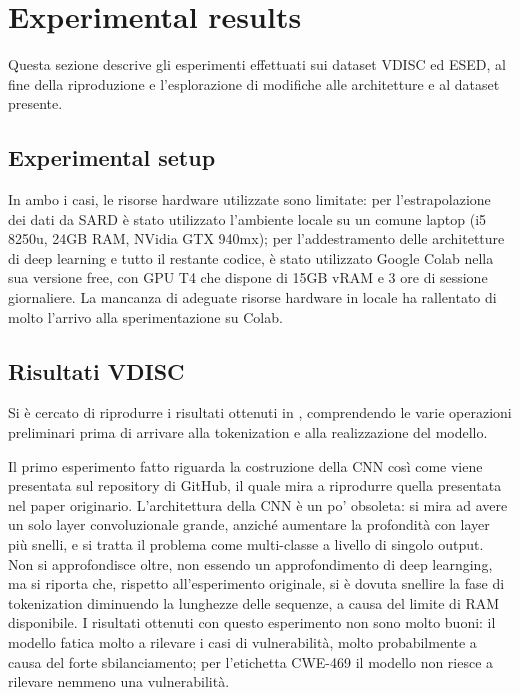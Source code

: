 \documentclass[conference]{IEEEtran}
\begin{document}
\section{Experimental results}

Questa sezione descrive gli esperimenti effettuati sui dataset VDISC ed ESED, al fine della riproduzione e l'esplorazione di modifiche alle architetture e al dataset presente.

\subsection{Experimental setup}
In ambo i casi, le risorse hardware utilizzate sono limitate: per l'estrapolazione dei dati da SARD è stato utilizzato l'ambiente locale su un comune laptop (i5 8250u, 24GB RAM, NVidia GTX 940mx); per l'addestramento delle architetture di deep learning e tutto il restante codice, è stato utilizzato Google Colab nella sua versione free, con GPU T4 che dispone di 15GB vRAM e 3 ore di sessione giornaliere. La mancanza di adeguate risorse hardware in locale ha rallentato di molto l'arrivo alla sperimentazione su Colab.

\subsection{Risultati VDISC}

Si è cercato di riprodurre i risultati ottenuti in \cite{Ykartal2024}, comprendendo le varie operazioni preliminari prima di arrivare alla tokenization e alla realizzazione del modello. 

Il primo esperimento fatto riguarda la costruzione della CNN così come viene presentata sul repository di GitHub, il quale mira a riprodurre quella presentata nel paper originario. L'architettura della CNN è un po' obsoleta: si mira ad avere un solo layer convoluzionale grande, anziché aumentare la profondità con layer più snelli, e si tratta il problema come multi-classe a livello di singolo output. Non si approfondisce oltre, non essendo un approfondimento di deep learnging, ma si riporta che, rispetto all'esperimento originale, si è dovuta snellire la fase di tokenization diminuendo la lunghezze delle sequenze, a causa del limite di RAM disponibile. I risultati ottenuti con questo esperimento non sono molto buoni: il modello fatica molto a rilevare i casi di vulnerabilità, molto probabilmente a causa del forte sbilanciamento; per l'etichetta CWE-469 il modello non riesce a rilevare nemmeno una vulnerabilità.
\end{document}
